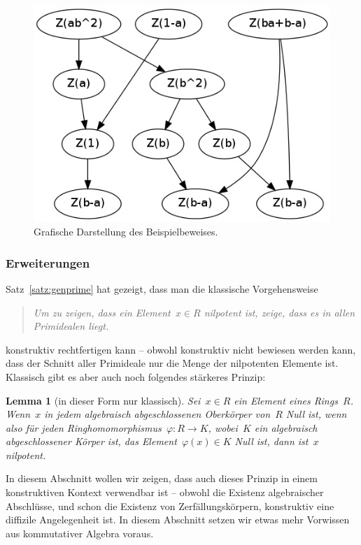 \documentclass[a4paper,ngerman,12pt]{scrartcl}
\theoremstyle{definition}
\theoremstyle{plain}
\newtheorem{lemma}[defn]{Lemma}
\theoremstyle{remark}
\renewcommand{\_}{\mathpunct{.}\,}
\newcommand{\?}{\,{:}\,}
\begin{document}
\begin{figure}
  \centering
  \includegraphics[scale=0.5]{dynamical-proof}
  \caption{\label{dynamical}Grafische Darstellung des Beispielbeweises.}
\end{figure}


\subsubsection*{Erweiterungen}

Satz~\ref{satz:genprime} hat gezeigt, dass man die klassische Vorgehensweise
\begin{quote}
\emph{Um zu zeigen, dass ein Element~$x \in R$ nilpotent ist, zeige, dass es in allen
Primidealen liegt.}\end{quote}
konstruktiv rechtfertigen kann -- obwohl konstruktiv nicht bewiesen werden
kann, dass der Schnitt aller Primideale nur die Menge der nilpotenten Elemente
ist. Klassisch gibt es aber auch noch folgendes stärkeres Prinzip:
\begin{lemma}[in dieser Form nur klassisch]\label{lemma:nullinabschl}%
Sei~$x \in R$ ein Element eines Rings~$R$. Wenn~$x$ in jedem algebraisch
abgeschlossenen Oberkörper von~$R$ Null ist, wenn also für jeden
Ringhomomorphismus~$\varphi : R \to K$, wobei~$K$ ein algebraisch
abgeschlossener Körper ist, das Element~$\varphi(x) \in K\!$ Null ist, dann
ist~$x$ nilpotent.\end{lemma}
In diesem Abschnitt wollen wir zeigen, dass auch dieses Prinzip
in einem konstruktiven Kontext verwendbar ist -- obwohl die Existenz
algebraischer Abschlüsse, und schon die Existenz von Zerfällungskörpern,
konstruktiv eine diffizile Angelegenheit ist. In diesem Abschnitt setzen wir
etwas mehr Vorwissen aus kommutativer Algebra voraus.
\end{document}
